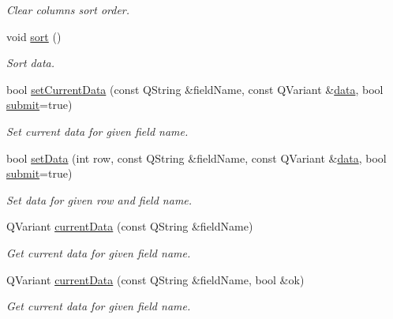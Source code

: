 \begin{DoxyCompactItemize}
\begin{DoxyCompactList}\small\item\em Clear columns sort order. \end{DoxyCompactList}\item 
void \hyperlink{classmdt_abstract_sql_table_controller_a47b1eedbfc74c5d80649350f801ad46d}{sort} ()
\begin{DoxyCompactList}\small\item\em Sort data. \end{DoxyCompactList}\item 
bool \hyperlink{classmdt_abstract_sql_table_controller_a2e7ec06d9148018d5fbeb4451bfe0780}{set\-Current\-Data} (const Q\-String \&field\-Name, const Q\-Variant \&\hyperlink{classmdt_abstract_sql_table_controller_a1801a01c0ce073c2e389b20f58a3d3ff}{data}, bool \hyperlink{classmdt_abstract_sql_table_controller_a14f3e2a91fc30ca0e018944f4f95bc33}{submit}=true)
\begin{DoxyCompactList}\small\item\em Set current data for given field name. \end{DoxyCompactList}\item 
bool \hyperlink{classmdt_abstract_sql_table_controller_abe56526399b9d9b0ab68139539ec616c}{set\-Data} (int row, const Q\-String \&field\-Name, const Q\-Variant \&\hyperlink{classmdt_abstract_sql_table_controller_a1801a01c0ce073c2e389b20f58a3d3ff}{data}, bool \hyperlink{classmdt_abstract_sql_table_controller_a14f3e2a91fc30ca0e018944f4f95bc33}{submit}=true)
\begin{DoxyCompactList}\small\item\em Set data for given row and field name. \end{DoxyCompactList}\item 
Q\-Variant \hyperlink{classmdt_abstract_sql_table_controller_a055b69caef2670ea1ba6a5095167663f}{current\-Data} (const Q\-String \&field\-Name)
\begin{DoxyCompactList}\small\item\em Get current data for given field name. \end{DoxyCompactList}\item 
Q\-Variant \hyperlink{classmdt_abstract_sql_table_controller_a3477c9a155627cb08b660182a6ad6ff4}{current\-Data} (const Q\-String \&field\-Name, bool \&ok)
\begin{DoxyCompactList}\small\item\em Get current data for given field name. \end{DoxyCompactList}\item 

\end{DoxyCompactItemize}

